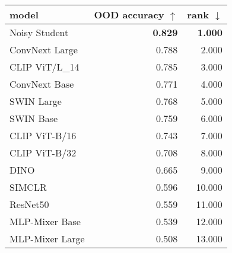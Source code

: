 \begin{tabular}{lrr}
\toprule
          model & OOD accuracy $\uparrow$ & rank $\downarrow$ \\
\midrule
  Noisy Student &          \textbf{0.829} &    \textbf{1.000} \\
 ConvNext Large &                   0.788 &             2.000 \\
 CLIP ViT/L\_14 &                   0.785 &             3.000 \\
  ConvNext Base &                   0.771 &             4.000 \\
     SWIN Large &                   0.768 &             5.000 \\
      SWIN Base &                   0.759 &             6.000 \\
  CLIP ViT-B/16 &                   0.743 &             7.000 \\
  CLIP ViT-B/32 &                   0.708 &             8.000 \\
           DINO &                   0.665 &             9.000 \\
         SIMCLR &                   0.596 &            10.000 \\
       ResNet50 &                   0.559 &            11.000 \\
 MLP-Mixer Base &                   0.539 &            12.000 \\
MLP-Mixer Large &                   0.508 &            13.000 \\
\bottomrule
\end{tabular}

